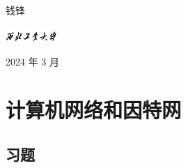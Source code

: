 \documentclass[10pt,UTF8]{ctexbook} %
\begin{document}
\begin{flushright}
    \kaishu
    钱锋

    \includegraphics*[width = 20mm]{pic/npu_2.png}

    2024 年 3 月
    \songti
\end{flushright}

\newpage
\thispagestyle{empty}

\pagestyle{plain}
{\tableofcontents}
\newpage
\thispagestyle{empty}
\cleardoublepage %


\makeatletter
\let\ps@plain\ps@empty
\makeatother

\mainmatter

\chapter{计算机网络和因特网}

\section{习题}

\end{document}
